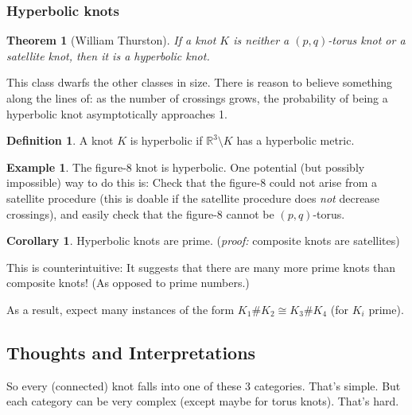 \documentclass[11pt]{article}
\newcommand{\R}{\mathbb{R}}
\theoremstyle{plain}
\newtheorem{thm}{Theorem}
\theoremstyle{definition}
\newtheorem{definition}{Definition}
\newtheorem{cor}{Corollary}
\newtheorem{ex}{Example}
\begin{document}
\subsubsection{Hyperbolic knots}

\begin{thm}[William Thurston]
  If a knot $K$ is neither a $(p,q)$-torus knot or a satellite knot, then it is a hyperbolic knot.
\end{thm}

This class dwarfs the other classes in size. There is reason to believe something along the lines of: as the number of crossings grows, the probability of being a hyperbolic knot asymptotically approaches 1.

\begin{definition}
  A knot $K$ is hyperbolic if $\R^3 \setminus K$ has a hyperbolic metric.
\end{definition}


\begin{ex}
The figure-8 knot is hyperbolic. One potential (but possibly impossible) way to do this is: Check that the figure-8 could not arise from a satellite procedure (this is doable if the satellite procedure does \textit{not} decrease crossings), and easily check that the figure-8 cannot be $(p,q)$-torus.
\end{ex}


\begin{cor}
  Hyperbolic knots are prime. (\textit{proof:} composite knots are satellites)
\end{cor}

This is counterintuitive: It suggests that there are many more prime knots than composite knots! (As opposed to prime numbers.) 

As a result, expect many instances of the form $K_1\# K_2\cong K_3\# K_4$ (for $K_i$ prime).


\subsection{Thoughts and Interpretations}

So every (connected) knot falls into one of these 3 categories. That's simple. But each category can be very complex (except maybe for torus knots). That's hard.
\end{document}
